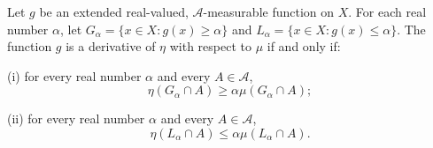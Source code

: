 Let $g$ be an extended real-valued, $\mathcal{A}$-measurable function on $X$. For each real number $\alpha$, let $G_\alpha = \{x \in X : g(x) \geq \alpha\}$ and $L_\alpha = \{x \in X : g(x) \leq \alpha\}$. The function $g$ is a derivative of $\eta$ with respect to $\mu$ if and only if:

(i) for every real number $\alpha$ and every $A \in \mathcal{A}$,
$$\eta(G_\alpha \cap A) \geq \alpha \mu(G_\alpha \cap A);$$

(ii) for every real number $\alpha$ and every $A \in \mathcal{A}$,
$$\eta(L_\alpha \cap A) \leq \alpha \mu(L_\alpha \cap A).$$
